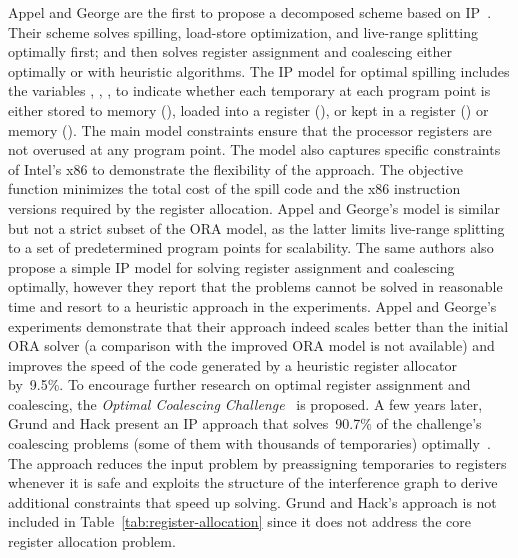 \documentclass[acmsmall,authorversion,nonacm]{acmart}
\newcommand{\var}[2]{}
\begin{document}
Appel and George are the first to propose a decomposed scheme based on
IP~\cite{Appel2001}.
Their scheme solves spilling, load-store optimization, and live-range
splitting optimally first; and then solves register assignment and
coalescing either optimally or with heuristic algorithms.
The IP model for optimal spilling includes the variables \var{s}{t,p},
\var{l}{t,p} \var{r}{t,p}, \var{m}{t,p}, to indicate whether each
temporary  at each program point  is either stored to memory
(), loaded into a register (), or kept in a register () or
memory ().
The main model constraints ensure that the processor registers are not
overused at any program point.
The model also captures specific constraints of Intel's x86 to
demonstrate the flexibility of the approach.
The objective function minimizes the total cost of the spill code and
the x86 instruction versions required by the register allocation.
Appel and George's model is similar but not a strict subset of the ORA
model, as the latter limits live-range splitting to a set of
predetermined program points for scalability.
The same authors also propose a simple IP model for solving register
assignment and coalescing optimally, however they report that the
problems cannot be solved in reasonable time and resort to a heuristic
approach in the experiments.
Appel and George's experiments demonstrate that their approach indeed
scales better than the initial ORA solver (a comparison with the
improved ORA model is not available) and improves the speed of the
code generated by a heuristic register allocator by~9.5\%.
To encourage further research on optimal register assignment and
coalescing, the \emph{Optimal Coalescing Challenge}~\cite{OCC} is
proposed.
A few years later, Grund and Hack present an IP approach that
solves~90.7\% of the challenge's coalescing problems (some of them
with thousands of temporaries) optimally~\cite{Grund2007}.
The approach reduces the input problem by preassigning temporaries to
registers whenever it is safe and exploits the structure of the
interference graph to derive additional constraints that speed up
solving.
Grund and Hack's approach is not included in
Table~\ref{tab:register-allocation} since it does not address the core
register allocation problem.
\end{document}
